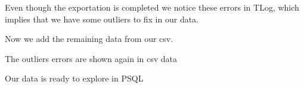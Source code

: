 Even though the exportation is completed we notice these errors in TLog, which implies that we have some outliers to fix in our data.
\begin{figure}[H]
\centering
{}
\end{figure}
\vskip0.2cm

Now we add the remaining data from our csv. 
\begin{figure}[H]
\centering
{}
\end{figure}

The outliers errors are shown again in csv data
\begin{figure}[H]
\centering
{}
\end{figure}

Our data is ready to explore in PSQL
\begin{figure}[H]
\centering
{}
\end{figure}

